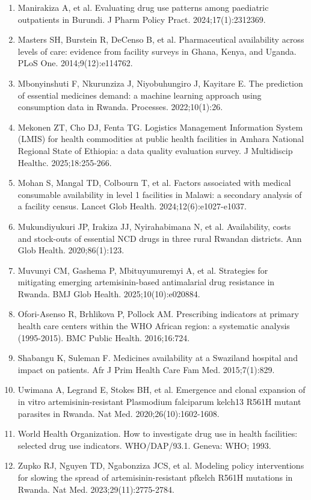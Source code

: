 \documentclass[10pt,a4paper]{report}
\begin{document}
\begin{enumerate}[leftmargin=1.6em,itemsep=2pt]
\item Manirakiza A, et al. Evaluating drug use patterns among paediatric outpatients in Burundi. J Pharm Policy Pract. 2024;17(1):2312369.
\item Masters SH, Burstein R, DeCenso B, et al. Pharmaceutical availability across levels of care: evidence from facility surveys in Ghana, Kenya, and Uganda. PLoS One. 2014;9(12):e114762.
\item Mbonyinshuti F, Nkurunziza J, Niyobuhungiro J, Kayitare E. The prediction of essential medicines demand: a machine learning approach using consumption data in Rwanda. Processes. 2022;10(1):26.
\item Mekonen ZT, Cho DJ, Fenta TG. Logistics Management Information System (LMIS) for health commodities at public health facilities in Amhara National Regional State of Ethiopia: a data quality evaluation survey. J Multidiscip Healthc. 2025;18:255-266.
\item Mohan S, Mangal TD, Colbourn T, et al. Factors associated with medical consumable availability in level 1 facilities in Malawi: a secondary analysis of a facility census. Lancet Glob Health. 2024;12(6):e1027-e1037.
\item Mukundiyukuri JP, Irakiza JJ, Nyirahabimana N, et al. Availability, costs and stock-outs of essential NCD drugs in three rural Rwandan districts. Ann Glob Health. 2020;86(1):123.
\item Muvunyi CM, Gashema P, Mbituyumuremyi A, et al. Strategies for mitigating emerging artemisinin-based antimalarial drug resistance in Rwanda. BMJ Glob Health. 2025;10(10):e020884.
\item Ofori-Asenso R, Brhlikova P, Pollock AM. Prescribing indicators at primary health care centers within the WHO African region: a systematic analysis (1995-2015). BMC Public Health. 2016;16:724.
\item Shabangu K, Suleman F. Medicines availability at a Swaziland hospital and impact on patients. Afr J Prim Health Care Fam Med. 2015;7(1):829.
\item Uwimana A, Legrand E, Stokes BH, et al. Emergence and clonal expansion of in vitro artemisinin-resistant Plasmodium falciparum kelch13 R561H mutant parasites in Rwanda. Nat Med. 2020;26(10):1602-1608.
\item World Health Organization. How to investigate drug use in health facilities: selected drug use indicators. WHO/DAP/93.1. Geneva: WHO; 1993.
\item Zupko RJ, Nguyen TD, Ngabonziza JCS, et al. Modeling policy interventions for slowing the spread of artemisinin-resistant pfkelch R561H mutations in Rwanda. Nat Med. 2023;29(11):2775-2784.
\end{enumerate}
\end{document}
